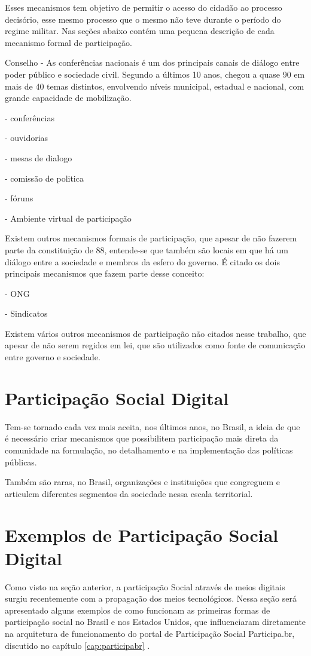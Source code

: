 Esses mecanismos tem objetivo de permitir o acesso do cidadão ao processo decisório, esse mesmo processo que o mesmo não teve durante o período do regime militar. Nas seções abaixo contém uma pequena descrição de cada mecanismo formal de participação.

Conselho - As conferências nacionais é um dos principais canais de diálogo entre poder público e sociedade civil. Segundo a  últimos 10 anos, chegou a quase 90 em mais de 40 temas distintos, envolvendo níveis municipal, estadual e nacional, com grande capacidade de mobilização. 

- conferências

- ouvidorias

- mesas de dialogo

- comissão de politica

- fóruns 

- Ambiente virtual de participação

Existem outros mecanismos formais de participação, que apesar de não fazerem parte da constituição de 88, entende-se que também são locais em que há um diálogo entre a sociedade e membros da esfero do governo. É citado os dois principais mecanismos que fazem parte desse conceito:

- ONG

- Sindicatos

Existem vários outros mecanismos de participação não citados nesse trabalho, que apesar de não serem regidos em lei, que são utilizados como fonte de comunicação entre governo e sociedade.

\section{Participação Social Digital}

Tem-se tornado cada vez mais aceita, nos últimos anos, no Brasil, a ideia de que é necessário criar mecanismos que possibilitem participação mais direta da comunidade na formulação, no detalhamento e na implementação das políticas públicas.

Também são raras, no Brasil, organizações e instituições que congreguem e articulem diferentes segmentos da sociedade nessa escala territorial. 


\section{Exemplos de Participação Social Digital}

Como visto na seção anterior, a participação Social através de meios digitais surgiu recentemente com a propagação dos meios tecnológicos. Nessa seção será apresentado alguns exemplos de como funcionam as primeiras formas de participação social no Brasil e nos Estados Unidos, que influenciaram diretamente na arquitetura de funcionamento do portal de Participação Social Participa.br, discutido no capítulo \ref{cap:participabr} .

